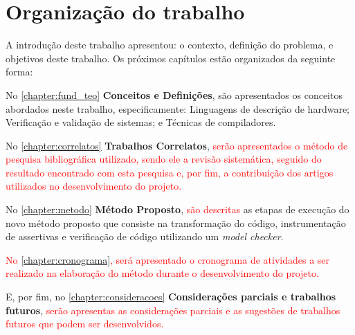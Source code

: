\section{Organização do trabalho}
A introdução deste trabalho apresentou: o contexto, definição do problema, e objetivos deste trabalho. Os próximos capítulos estão organizados da seguinte forma:

\par
No \autoref{chapter:fund_teo} \textbf{Conceitos e Definições}, são apresentados os conceitos abordados neste trabalho, especificamente: Linguagens de descrição de hardware; Verificação e validação de sistemas; e Técnicas de compiladores.

\par
No \autoref{chapter:correlatos} \textbf{Trabalhos Correlatos}, \textcolor{red}{serão apresentados o método de pesquisa bibliográfica utilizado, sendo ele a revisão sistemática, seguido do resultado encontrado com esta pesquisa e, por fim, a contribuição dos artigos utilizados no desenvolvimento do projeto.} 

\par
No \autoref{chapter:metodo} \textbf{Método Proposto}, \textcolor{red}{são descritas} as etapas de execução do novo método proposto que consiste na transformação do código, instrumentação de assertivas e verificação de código utilizando um \textit{model checker}.

\par
\textcolor{red}{No \autoref{chapter:cronograma}, será apresentado o cronograma de atividades a ser realizado na elaboração do método durante o desenvolvimento do projeto.}

\par

\par
E, por fim, no \autoref{chapter:consideracoes} \textbf{Considerações parciais e trabalhos futuros}, \textcolor{red}{serão apresentas as considerações parciais e as sugestões de trabalhos futuros que podem ser desenvolvidos.}